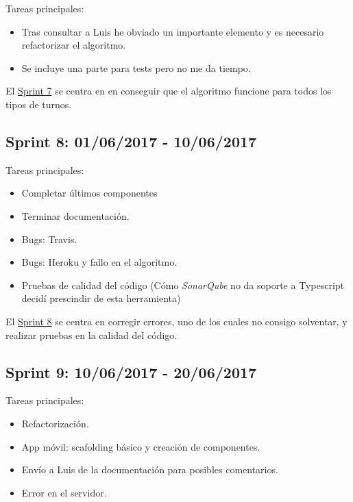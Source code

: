 Tareas principales:

\begin{itemize}

		\item Tras consultar a Luis he obviado un importante elemento y es necesario refactorizar el algoritmo.
	\item Se incluye una parte para tests pero no me da tiempo.
\end{itemize}


El \underline{Sprint 7} se centra en en conseguir que el algoritmo funcione para todos los tipos de turnos.

\subsection{Sprint 8: 01/06/2017 - 10/06/2017}\label{sprint8}

Tareas principales:

\begin{itemize}
	\item Completar últimos componentes
	\item Terminar documentación.
	\item Bugs: Travis. 
	\item Bugs: Heroku y fallo en el algoritmo.
	\item Pruebas de calidad del código (Cómo \emph{SonarQube} no da soporte a Typescript decidí prescindir de esta herramienta)
\end{itemize}


El \underline{Sprint 8} se centra en corregir errores, uno de los cuales no consigo solventar, y realizar pruebas en la calidad del código. 

\subsection{Sprint 9: 10/06/2017 - 20/06/2017}\label{sprint9}

Tareas principales:

\begin{itemize}
	\item Refactorización.
	\item App móvil: scafolding básico y creación de componentes.
	\item Envío a Luis de la documentación para posibles comentarios.
	\item Error en el servidor.
	
\end{itemize}

